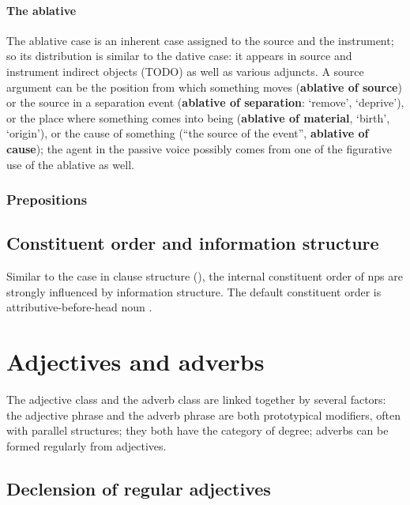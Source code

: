 \documentclass[a4paper, oneside, 12pt]{report}
\newcommand*{\citepage}[1]{p.~{#1}}
\newcommand*{\concept}[1]{\textbf{#1}}
\newcommand{\translate}[1]{`#1'}
\begin{document}
\subsubsection{The ablative}

The ablative case is an inherent case assigned to 
the source and the instrument;
so its distribution is similar to the dative case: 
it appears in source and instrument indirect objects (TODO) 
as well as various adjuncts.
A source argument
can be the position from which something moves 
(\concept{ablative of source})
or the source in a separation event 
(\concept{ablative of separation}: \translate{remove}, \translate{deprive}),
or the place where something comes into being 
(\concept{ablative of material}, \translate{birth}, \translate{origin}), 
or the cause of something (``the source of the event'', \concept{ablative of cause});
the agent in the passive voice possibly 
comes from one of the figurative use of the ablative as well.

\subsection{Prepositions}

\section{Constituent order and information structure}

Similar to the case in clause structure (),
the internal constituent order of \acs{np}s are strongly influenced by 
information structure.
The default constituent order is attributive-before-head noun
\citep[\citepage{396}]{allen1903allen}.

\chapter{Adjectives and adverbs}

The adjective class and the adverb class are linked together by several factors:
the adjective phrase and the adverb phrase are both prototypical modifiers,
often with parallel structures;
they both have the category of degree; 
adverbs can be formed regularly from adjectives.

\section{Declension of regular adjectives}
\end{document}
